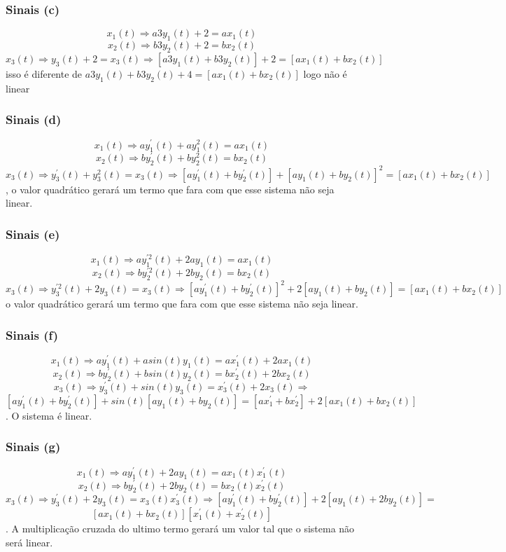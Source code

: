 \documentclass[a4paper, 12pt]{article}
\begin{document}
            \subsubsection{Sinais (c)}
            \[x_{1}(t)  \Rightarrow a3y_{1}(t) + 2 = ax_{1}(t)\]
            \[x_{2}(t)  \Rightarrow b3y_{2}(t) + 2 = bx_{2}(t)\]
			\[x_{3}(t)  \Rightarrow y_{3}(t) + 2 = x_{3}(t) \Rightarrow [a3y_{1}(t) + b3y_{2}(t)] +2 =  [ax_{1}(t) + bx_{2}(t)]\] isso é diferente de $a3y_{1}(t) + b3y_{2}(t) + 4 = [ax_{1}(t) + bx_{2}(t)]$ logo não é linear

            \subsubsection{Sinais (d)}
            \[x_{1}(t)  \Rightarrow ay_{1}^{'}(t) + ay_{1}^{2}(t) = ax_{1}(t)\]
            \[x_{2}(t)  \Rightarrow by_{2}^{'}(t) + by_{2}^{2}(t) = bx_{2}(t)\]
			\[x_{3}(t)  \Rightarrow y_{3}^{'}(t) + y_{3}^{2}(t) = x_{3}(t) \Rightarrow [ay_{1}^{'}(t) + by_{2}^{'}(t)] + [ay_{1}(t) + by_{2}(t)]^{2} =  [ax_{1}(t) + bx_{2}(t)]\], o valor quadrático gerará um termo que fara com que esse sistema não seja linear.
            \subsubsection{Sinais (e)}
            \[ x_{1}(t) \Rightarrow ay_{1}^{'2}(t) + 2ay_{1}(t)  = ax_{1}(t)\]
            \[ x_{2}(t) \Rightarrow by_{2}^{'2}(t) + 2by_{2}(t)  = bx_{2}(t)\]
			\[ x_{3}(t) \Rightarrow y_{3}^{'2}(t) + 2y_{3}(t) = x_{3}(t) \Rightarrow [ay_{1}^{'}(t) + by_{2}^{'}(t)]^{2} + 2[ay_{1}(t) + by_{2}(t)] =  [ax_{1}(t) + bx_{2}(t)]\] o valor quadrático gerará um termo que fara com que esse sistema não seja linear.
            \subsubsection{Sinais (f)}
            \[ x_{1}(t) \Rightarrow ay_{1}^{'}(t) + asin(t)y_{1}(t)  = ax_{1}^{'}(t) + 2ax_{1}(t)\]
            \[ x_{2}(t) \Rightarrow by_{2}^{'}(t) + bsin(t)y_{2}(t)  = bx_{2}^{'}(t) + 2bx_{2}(t)\]
			\[ x_{3}(t) \Rightarrow y_{3}^{'}(t) + sin(t)y_{3}(t) =  x_{3}^{'}(t) + 2x_{3}(t) \Rightarrow\]
			\[[ay_{1}^{'}(t) + by_{2}^{'}(t)] + sin(t)[ay_{1}(t) + by_{2}(t)] = [ax_{1}^{'} + bx_{2}^{'}] + 2[ax_{1}(t) + bx_{2}(t)]\]. O sistema é linear.
            \subsubsection{Sinais (g)}
            \[ x_{1}(t) \Rightarrow ay_{1}^{'}(t) + 2ay_{1}(t) = ax_{1}(t)x_{1}^{'}(t)\]
            \[ x_{2}(t) \Rightarrow by_{2}^{'}(t) + 2by_{2}(t) = bx_{2}(t)x_{2}^{'}(t)\]
			\[ x_{3}(t) \Rightarrow y_{3}^{'}(t) + 2y_{3}(t) = x_{3}(t)x_{3}^{'}(t) \Rightarrow [ay_{1}^{'}(t) + by_{2}^{'}(t)] + 2[ay_{1}(t) + 2by_{2}(t)] = \]
			\[[ax_{1}(t) + bx_{2}(t)][x_{1}^{'}(t)+x_{2}^{'}(t)]\]. A multiplicação cruzada do ultimo termo gerará um valor tal que o sistema não será linear.
\end{document}
